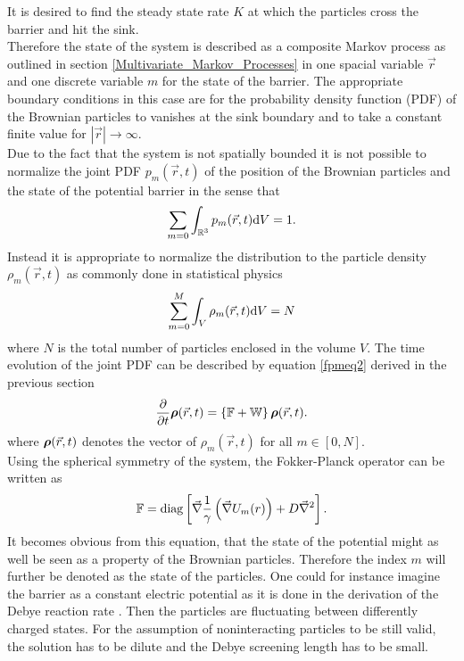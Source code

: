 It is desired to find the steady state rate $K$ at which the particles cross the barrier and hit the sink.\\
Therefore the state of the system is described as a composite Markov process as outlined in section \ref{Multivariate_Markov_Processes} in one spacial variable $\vec{r}$ and one discrete variable $m$ for the state of the barrier.
The appropriate boundary conditions in this case are for the probability density function (PDF) of the Brownian particles to vanishes at the sink boundary and to take a constant finite value for $|\vec{r}| \rightarrow \infty$. \\
Due to the fact that the system is not spatially bounded it is not possible to normalize the joint PDF $p_m(\vec{r},t)$ of the position of the Brownian particles and the state of the potential barrier in the sense that 
\begin{equation}
    \sum_{m=0} \int_{\mathbb{R}^{3}} p_m(\vec{r},t) {\rm d}V = 1.
    \label{pdfNormalization}
\end{equation}
Instead it is appropriate to normalize the distribution to the particle density $\rho_m(\vec{r},t)$ as commonly done in statistical physics
\begin{equation}
    \sum\limits_{m=0}^{M} \int_V \rho_m(\vec{r},t) {\rm d}V = N
    \label{densNormalization}
\end{equation}
where $N$ is the total number of particles enclosed in the volume $V$. The time evolution of the joint PDF can be described by equation \eqref{fpmeq2} derived in the previous section
\begin{equation}
    \frac{\partial}{\partial t}\boldsymbol{\mathbf{\rho}}(\vec{r},t) = \left\{ \mathbb{F} + \mathbb{W} \right\} \boldsymbol{\mathbf{\rho}}(\vec{r},t).
    \label{fpmeq3}
\end{equation}
where $\boldsymbol{\mathbf{\rho}}(\vec{r},t)$ denotes the vector of $\rho_m(\vec{r},t)$ for all $m \in [0,N]$. \\
Using the spherical symmetry of the system, the Fokker-Planck operator can be written as
\begin{equation}
    \mathbb{F} = {\rm diag}\left[ \vec{\nabla}\frac{1}{\gamma}\left( \vec{\nabla} U_m(r) \right)+ D \vec{\nabla}^{2} \right].
    \label{fpo2}
\end{equation}
It becomes obvious from this equation, that the state of the potential might as well be seen as a property of the Brownian particles. Therefore the index $m$ will further be denoted as the state of the particles. One could for instance imagine the barrier as a constant electric potential as it is done in the derivation of the Debye reaction rate \cite{Debye1942}. Then the particles are fluctuating between differently charged states. For the assumption of noninteracting particles to be still valid, the solution has to be dilute and the Debye screening length has to be small. \\

